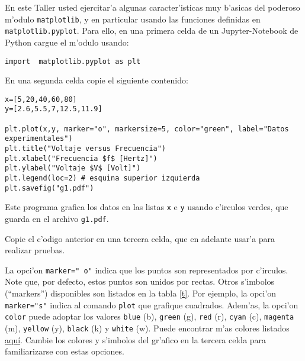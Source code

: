\documentclass[11pt]{exam}
\begin{document}
\firstpageheadrule
\runningheadrule
{}
\cfoot{ }
\begin{flushleft}
\vspace{0.2in}
\vspace{0.25cm}
\end{flushleft}

\begin{questions}

\item En este Taller usted ejercitar'a algunas caracter'isticas muy b'asicas del  poderoso m'odulo \texttt{matplotlib}, y en particular usando las funciones definidas en \texttt{matplotlib.pyplot}. Para ello, en una primera celda de un Jupyter-Notebook de Python cargue el m'odulo usando:
\begin{verbatim}
import  matplotlib.pyplot as plt
\end{verbatim}
\item En una segunda celda copie el siguiente contenido:
\begin{verbatim}
x=[5,20,40,60,80]
y=[2.6,5.5,7,12.5,11.9]

plt.plot(x,y, marker="o", markersize=5, color="green", label="Datos experimentales")
plt.title("Voltaje versus Frecuencia")
plt.xlabel("Frecuencia $f$ [Hertz]")
plt.ylabel("Voltaje $V$ [Volt]")
plt.legend(loc=2) # esquina superior izquierda
plt.savefig("g1.pdf")
\end{verbatim}
Este programa grafica los datos en las listas \texttt{x} e \texttt{y} usando c'irculos verdes, que guarda en el archivo \texttt{g1.pdf}.
\item Copie el c'odigo anterior en una tercera celda, que en adelante usar'a para realizar pruebas. 
\item La opci'on \texttt{marker="\,o"} indica que los puntos son representados por c'irculos. Note que, por defecto, estos puntos son unidos por rectas. Otros s'imbolos (``markers'') disponibles son listados en la tabla \ref{t}. Por ejemplo, la opci'on \texttt{marker="s"} indica al comando \texttt{plot} que grafique cuadrados. 
Adem'as, la opci'on \texttt{color} puede adoptar los valores \texttt{blue} (b), \texttt{green} (g), \texttt{red} (r), \texttt{cyan} (c), \texttt{magenta} (m), \texttt{yellow} (y), \texttt{black} (k) y \texttt{white} (w). Puede encontrar m'as colores listados \href{http://matplotlib.org/examples/color/named_colors.html}{aqu\'i}. Cambie los colores y s'imbolos del gr'afico en la tercera celda para familiarizarse con estas opciones.


\end{questions}
\end{document}
